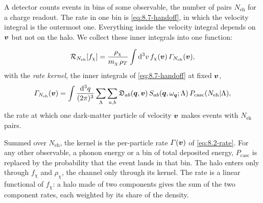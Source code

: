 A detector counts events in bins of some observable, the number of pairs $N_{\mathrm{eh}}$ for a charge readout. The rate in one bin is \cref{eq:8.7-handoff}, in which the velocity integral is the outermost one. Everything inside the velocity integral depends on $\bm{v}$ but not on the halo. We collect these inner integrals into one function:
\begin{keyresult}
\begin{equation}
  \mathcal{R}_{N_{\mathrm{eh}}}[f_\chi] = \frac{\rho_\chi}{m_{\chi}\,\rho_T}\int\mathrm{d}^3v\,f_\chi(\bm{v})\,\varGamma_{N_{\mathrm{eh}}}(\bm{v}) ,
  \label{eq:21.1-functional}
\end{equation}
with the \emph{rate kernel}, the inner integrals of \cref{eq:8.7-handoff} at fixed $\bm{v}$,
\begin{equation}
  \varGamma_{N_{\mathrm{eh}}}(\bm{v}) = \int\frac{\mathrm{d}^3q}{(2\pi)^3}\sum_\Lambda\sum_{a,b}\mathfrak{D}_{ab}(\bm{q},\bm{v})\,S_{ab}(\bm{q},\omega_{\bm{q}};\Lambda)\,P_{\mathrm{casc}}(N_{\mathrm{eh}}|\Lambda) ,
  \label{eq:21.1-kernel}
\end{equation}
the rate at which one dark-matter particle of velocity $\bm{v}$ makes events with $N_{\mathrm{eh}}$ pairs.
\end{keyresult}
\noindent Summed over $N_{\mathrm{eh}}$, the kernel is the per-particle rate $\varGamma(\bm{v})$ of \cref{eq:8.2-rate}. For any other observable, a phonon energy or a bin of total deposited energy, $P_{\mathrm{casc}}$ is replaced by the probability that the event lands in that bin. The halo enters only through $f_\chi$ and $\rho_\chi$, the channel only through its kernel. The rate is a linear functional of $f_\chi$: a halo made of two components gives the sum of the two component rates, each weighted by its share of the density.

